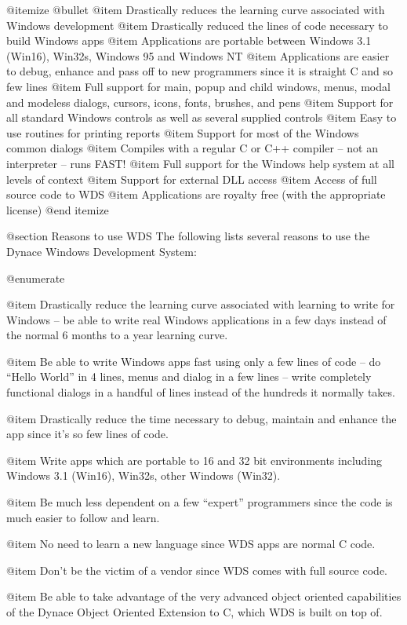 @itemize @bullet
@item Drastically reduces the learning curve associated with Windows
development
@item Drastically reduced the lines of code necessary to build Windows apps
@item Applications are portable between Windows 3.1 (Win16), Win32s,
Windows 95 and Windows NT
@item Applications are easier to debug, enhance and pass off to new programmers
since it is straight C and so few lines
@item Full support for main, popup and child windows, menus,
modal and modeless dialogs, cursors, icons, fonts, brushes, and pens
@item Support for all standard Windows controls as well as several supplied controls
@item Easy to use routines for printing reports
@item Support for most of the Windows common dialogs
@item Compiles with a regular C or C++ compiler -- not an interpreter -- 
runs FAST!
@item Full support for the Windows help system at all levels of context
@item Support for external DLL access
@item Access of full source code to WDS
@item Applications are royalty free (with the appropriate license)
@end itemize

@section Reasons to use WDS
The following lists several reasons to use the Dynace Windows
Development System:

@enumerate

@item
Drastically reduce the learning curve associated with learning to
write for Windows -- be able to write real Windows applications in
a few days instead of the normal 6 months to a year learning curve.

@item
Be able to write Windows apps fast using only a few lines of code --
do ``Hello World'' in 4 lines, menus and dialog in a few lines -- write
completely functional dialogs in a handful of lines instead of the
hundreds it normally takes.

@item
Drastically reduce the time necessary to debug, maintain and enhance the
app since it's so few lines of code.

@item
Write apps which are portable to 16 and 32 bit environments including
Windows 3.1 (Win16), Win32s, other Windows (Win32).

@item
Be much less dependent on a few ``expert'' programmers since the code
is much easier to follow and learn.

@item
No need to learn a new language since WDS apps are normal C code.

@item
Don't be the victim of a vendor since WDS comes with full source code.

@item
Be able to take advantage of the very advanced object oriented
capabilities of the Dynace Object Oriented Extension to C, which
WDS is built on top of.

